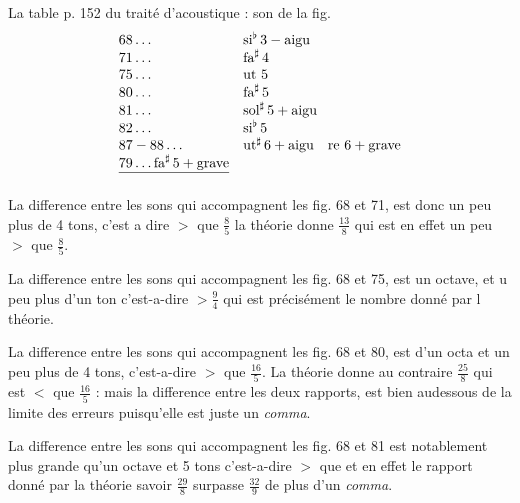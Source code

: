 \documentclass[11pt,a4paper]{article}
\begin{document}
La table p. 152 du traité d'acoustique : son de la fig.
\[
\begin{array}{ll}
68 \ldots & \text{si}^{\flat}\,3 - \text{aigu}\\
71 \ldots & \text{fa}^{\sharp}\,4\\
75 \ldots & \text{ut }5\\
80 \ldots & \text{fa}^{\sharp}\,5\\
81 \ldots & \text{sol}^{\sharp}\,5 + \text{aigu}\\
82 \ldots & \text{si}^{\flat}\,5\\
87-88 \ldots & \text{ut}^{\sharp}\,6 + \text{aigu}\quad \text{re }6 + \text{grave}\\
\struck{79 \ldots \text{fa}^{\sharp}\,5 + \text{grave}} &
\end{array}
\]


La difference entre les sons qui accompagnent les fig. 68 et 71, est donc un
peu plus de 4 tons, c'est a dire $>$ que $\frac{8}{5}$ la théorie donne $\frac{13}{8}$ qui est en effet
un peu $>$ que $\frac{8}{5}$.

La difference entre les sons qui accompagnent les fig. 68 et 75, est un octave, et u
peu plus d'un ton c'est-a-dire $>\frac{9}{4}$ qui est précisément le nombre donné par l
théorie.

La difference entre les sons qui accompagnent les fig. 68 et 80, est d'un octa
et un peu plus de 4 tons, c'est-a-dire $>$ que $\frac{16}{5}$. La théorie donne
au contraire $\frac{25}{8}$ qui est $<$ que $\frac{16}{5}$ : mais la difference entre les deux
rapports, est bien audessous de la limite des erreurs puisqu'elle
est juste un \emph{comma}.

La difference entre les sons qui accompagnent les fig. 68 et 81 est
notablement plus grande qu'un octave et 5 tons c'est-a-dire $>$ que
et en effet le rapport donné par la théorie savoir $\frac{29}{8}$ surpasse
$\frac{32}{9}$ de plus d'un \emph{comma}.
\end{document}
